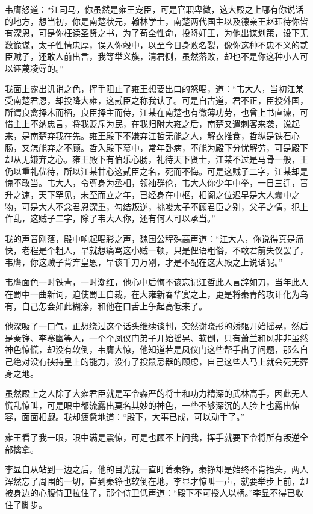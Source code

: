 韦膺怒道：“江司马，你虽然是雍王宠臣，可是官职卑微，这大殿之上哪有你说话的地方，想当初，你是南楚状元，翰林学士，南楚两代国主以及德亲王赵珏待你皆有深恩，可是你枉读圣贤之书，为了苟全性命，投降奸王，为他出谋划策，设下无数诡谋，太子性情忠厚，误入你彀中，以至今日身败名裂，像你这种不忠不义的贰臣贼子，还敢人前出言，我等举义旗，清君侧，虽然落败，却也不是你这种小人可以诬蔑凌辱的。”

我面上露出讥诮之色，挥手阻止了雍王想要出口的怒喝，道：“韦大人，当初江某受南楚君恩，却投降大雍，这贰臣之称我认了。可是自古道，君不正，臣投外国，所谓良禽择木而栖，良臣择主而侍，江某在南楚也有微薄功劳，也曾上书直谏，可惜主上不纳忠言，将我贬斥为民，在我归附大雍之后，南楚又遣刺客来袭，说起来，是南楚弃我在先。雍王殿下不嫌弃江哲无能之人，解衣推食，哲纵是铁石心肠，又怎能弃之不顾。哲入殿下幕中，常年卧病，不能为殿下分忧解劳，可是殿下却从无嫌弃之心。雍王殿下有伯乐心肠，礼待天下贤士，江某不过是马骨一般，王仍以重礼优待，所以江某甘心这贰臣之名，死而不悔。可是这贼子二字，江某却是愧不敢当。韦大人，令尊身为丞相，领袖群伦，韦大人你少年中举，一日三迁，晋升之速，天下罕见，未至而立之年，已经身在中枢，相阁之位迟早是大人囊中之物，可是大人不念君恩深重，勾结叛逆，挑唆太子不顾君臣之别，父子之情，犯上作乱，这贼子二字，除了韦大人你，还有何人可以承当。”

我的声音刚落，殿中响起喝彩之声，魏国公程殊高声道：“江大人，你说得真是痛快，老程是个粗人，早就想痛骂这小贼一顿，只是俚语粗俗，不敢君前失仪罢了，韦膺，你这贼子背弃皇恩，早该千刀万剐，才是不配在这大殿之上说话呢。”

韦膺面色一时铁青，一时潮红，他心中后悔不该忘记江哲此人言辞如刀，当年此人在蜀中一曲新词，迫使蜀王自裁，在大雍新春华宴之上，更是将秦青的攻讦化为乌有，自己怎会如此糊涂，和他在口舌上争起高低来了。

他深吸了一口气，正想绕过这个话头继续谈判，突然谢晓彤的娇躯开始摇晃，然后是秦铮、李寒幽等人，一个个凤仪门弟子开始摇晃、软倒，只有萧兰和风非非虽然神色惊慌，却没有软倒，韦膺大惊，他知道若是凤仪门这些帮手出了问题，那么自己绝对没有挟持皇上的能力，没有了投鼠忌器的顾虑，自己这些人马上就会死无葬身之地。

虽然殿上之人除了大雍君臣就是军令森严的将士和功力精深的武林高手，因此无人慌乱惊叫，可是眼中都流露出莫名其妙的神色，一些不够深沉的人脸上也露出惊容，面面相觑。我却疲惫地道：“殿下，大事已成，可以动手了。”

雍王看了我一眼，眼中满是震惊，可是也顾不上问我，挥手就要下令将所有叛逆全部擒拿。

李显自从站到一边之后，他的目光就一直盯着秦铮，秦铮却是始终不肯抬头，两人浑然忘了周围的一切，直到秦铮也软倒在地，李显才惊叫一声，就要举步上前，却被身边的心腹侍卫拉住了，那个侍卫低声道：“殿下不可授人以柄。”李显不得已收住了脚步。

